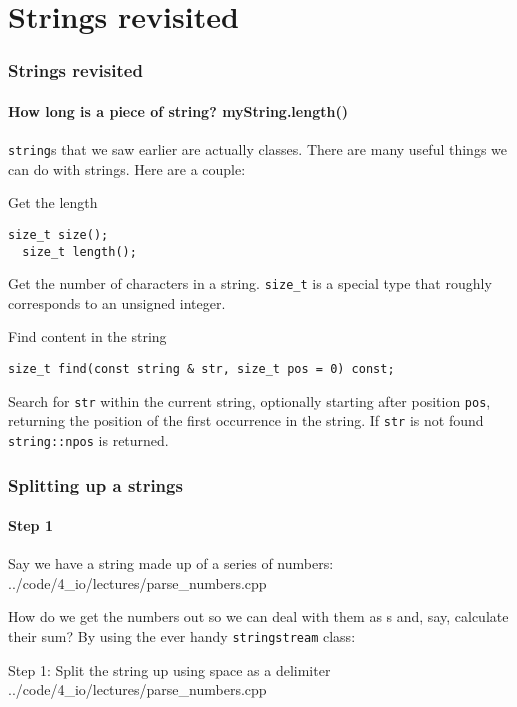 \documentclass[handout]{beamer}
\begin{document}
\section{Strings revisited}

\begin{frame}[fragile]
  \frametitle{Strings revisited}
  \framesubtitle{How long is a piece of string? myString.length()}
  
  \texttt{string}s that we saw earlier are actually classes.  There are many useful things we can do with strings.  Here are a couple:
  \pause  
  \begin{block}{Get the length}
    \begin{lstlisting}[aboveskip=0pt]
  size_t size();
  size_t length();
    \end{lstlisting}
    Get the number of characters in a string.  \texttt{size\_t} is a special type that roughly corresponds to an unsigned integer.
  \end{block}
  \pause
  \begin{block}{Find content in the string}
    \begin{lstlisting}[aboveskip=0pt]
  size_t find(const string & str, size_t pos = 0) const;
    \end{lstlisting}
    Search for \texttt{str} within the current string, optionally starting after position \texttt{pos}, returning the position of the first occurrence in the string.  If \texttt{str} is not found \texttt{string::npos} is returned.
  \end{block}

\end{frame}

\begin{frame}[fragile]
  \frametitle{Splitting up a strings}
  \framesubtitle{Step 1}
  
  Say we have a string made up of a series of numbers:
  	{../code/4_io/lectures/parse_numbers.cpp}

  How do we get the numbers out so we can deal with them as s and, say, calculate their sum?\newline\pause
  By using the ever handy \texttt{stringstream} class:

  \begin{block}{Step 1: Split the string up using space as a delimiter}
  		{../code/4_io/lectures/parse_numbers.cpp}
	\end{block}

\end{frame}
\end{document}
